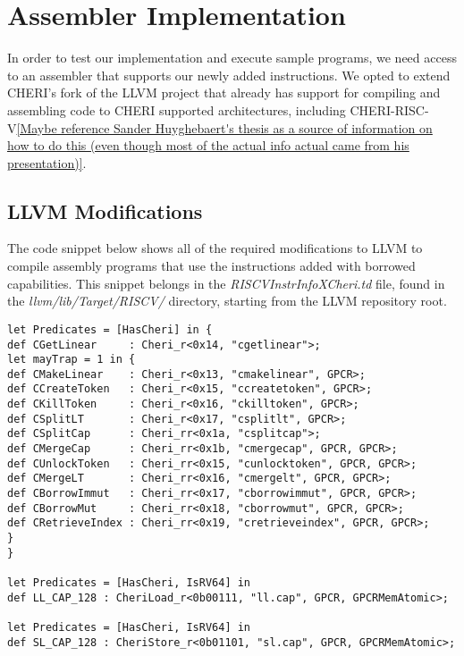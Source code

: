 \chapter{Assembler Implementation}
\label{chap:assemblerimpl}
In order to test our implementation and execute sample programs, we need access to an assembler that supports our newly added instructions. We opted to extend CHERI's fork of the LLVM project that already has support for compiling and assembling code to CHERI supported architectures, including CHERI-RISC-V\ref{Maybe reference Sander Huyghebaert's thesis as a source of information on how to do this (even though most of the actual info actual came from his presentation)}.

\section{LLVM Modifications}
The code snippet below shows all of the required modifications to LLVM to compile assembly programs that use the instructions added with borrowed capabilities. This snippet belongs in the \textit{RISCVInstrInfoXCheri.td} file, found in the \textit{llvm/lib/Target/RISCV/} directory, starting from the LLVM repository root.


\begin{verbatim}
let Predicates = [HasCheri] in {
def CGetLinear     : Cheri_r<0x14, "cgetlinear">;
let mayTrap = 1 in {
def CMakeLinear    : Cheri_r<0x13, "cmakelinear", GPCR>;
def CCreateToken   : Cheri_r<0x15, "ccreatetoken", GPCR>;
def CKillToken     : Cheri_r<0x16, "ckilltoken", GPCR>;
def CSplitLT       : Cheri_r<0x17, "csplitlt", GPCR>;
def CSplitCap      : Cheri_rr<0x1a, "csplitcap">;
def CMergeCap      : Cheri_rr<0x1b, "cmergecap", GPCR, GPCR>;
def CUnlockToken   : Cheri_rr<0x15, "cunlocktoken", GPCR, GPCR>;
def CMergeLT       : Cheri_rr<0x16, "cmergelt", GPCR, GPCR>;
def CBorrowImmut   : Cheri_rr<0x17, "cborrowimmut", GPCR, GPCR>;
def CBorrowMut     : Cheri_rr<0x18, "cborrowmut", GPCR, GPCR>;
def CRetrieveIndex : Cheri_rr<0x19, "cretrieveindex", GPCR, GPCR>;
}
}

let Predicates = [HasCheri, IsRV64] in
def LL_CAP_128 : CheriLoad_r<0b00111, "ll.cap", GPCR, GPCRMemAtomic>;

let Predicates = [HasCheri, IsRV64] in
def SL_CAP_128 : CheriStore_r<0b01101, "sl.cap", GPCR, GPCRMemAtomic>;
\end{verbatim}


